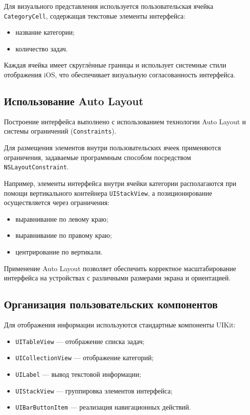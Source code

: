 \documentclass[14pt,a4paper]{extarticle}
\begin{document}
Для визуального представления используется пользовательская ячейка \texttt{CategoryCell}, содержащая текстовые элементы интерфейса:

\begin{itemize}
    \item название категории;
    \item количество задач.
\end{itemize}

Каждая ячейка имеет скруглённые границы и использует системные стили отображения iOS, что обеспечивает визуальную согласованность интерфейса.

\subsection{Использование Auto Layout}

Построение интерфейса выполнено с использованием технологии Auto Layout и системы ограничений (\texttt{Constraints}).

Для размещения элементов внутри пользовательских ячеек применяются ограничения, задаваемые программным способом посредством \texttt{NSLayoutConstraint}.

Например, элементы интерфейса внутри ячейки категории располагаются при помощи вертикального контейнера \texttt{UIStackView}, а позиционирование осуществляется через ограничения:

\begin{itemize}
    \item выравнивание по левому краю;
    \item выравнивание по правому краю;
    \item центрирование по вертикали.
\end{itemize}

Применение Auto Layout позволяет обеспечить корректное масштабирование интерфейса на устройствах с различными размерами экрана и ориентацией.

\subsection{Организация пользовательских компонентов}

Для отображения информации используются стандартные компоненты UIKit:

\begin{itemize}
    \item \texttt{UITableView} --- отображение списка задач;
    \item \texttt{UICollectionView} --- отображение категорий;
    \item \texttt{UILabel} --- вывод текстовой информации;
    \item \texttt{UIStackView} --- группировка элементов интерфейса;
    \item \texttt{UIBarButtonItem} --- реализация навигационных действий.
\end{itemize}
\end{document}
